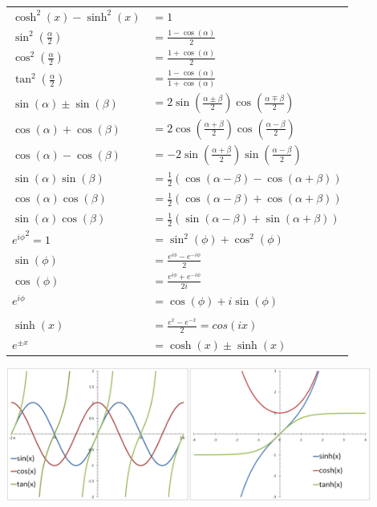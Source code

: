 \documentclass[6pt]{article}
\begin{document}
\begin{multicols*}{2}
\begin{multicols}{2}
	\columnbreak
	\hspace{-18pt}
	\begin{tabular}{l l}
		$ \cosh^2(x) - \sinh^2(x) $ & $= 1 $ \\
		$ \sin^2(\frac{\alpha}{2}) $  &  $ = \frac{1-\cos(\alpha)}{2} $ \\
		$ \cos^2(\frac{\alpha}{2}) $  &  $ = \frac{1+\cos(\alpha)}{2} $ \\
		$ \tan^2(\frac{\alpha}{2}) $  &  $ = \frac{1-\cos(\alpha)}{1+\cos(\alpha)} $ \\
		$ \sin(\alpha) \pm \sin(\beta) $  &  $ = 2 \sin(\frac{\alpha \pm \beta}{2}) \cos(\frac{\alpha \mp \beta}{2}) $ \\
		$ \cos(\alpha) + \cos(\beta) $  &  $ = 2 \cos(\frac{\alpha + \beta}{2}) \cos(\frac{\alpha - \beta}{2}) $ \\
		$ \cos(\alpha) - \cos(\beta) $  &  $ = - 2 \sin(\frac{\alpha + \beta}{2}) \sin(\frac{\alpha - \beta}{2}) $ \\
		$ \sin(\alpha)\sin(\beta) $  &  $ = \scriptstyle \frac{1}{2} \left( \cos(\alpha - \beta) - \cos(\alpha + \beta) \right) $ \\
		$ \cos(\alpha)\cos(\beta) $  &  $ = \scriptstyle \frac{1}{2} \left( \cos(\alpha - \beta) + \cos(\alpha + \beta) \right) $ \\
		$ \sin(\alpha)\cos(\beta) $  &  $ = \scriptstyle \frac{1}{2} \left( \sin(\alpha - \beta) + \sin(\alpha + \beta) \right) $ \\
		$ {e^{i\phi}}^2 = 1 $  & $ = \sin^2(\phi)+\cos^2(\phi) $ \\
		$ \sin(\phi) $  &  $ = \frac{e^{i \phi}-e^{-i\phi}}{2} $ \\
		$ \cos(\phi) $  &  $ = \frac{e^{i \phi}+e^{-i\phi}}{2i} $ \\
		$ e^{i\phi} $  &  $ = \cos(\phi)+i \sin(\phi) $ \\
		\\
		$ \sinh(x)$ & $= \frac{e^x-e^{-x}}{2} = cos(ix) $ \\
		$ e^{\pm x} $ & $= \cosh(x) \pm \sinh(x) $
	
	\end{tabular}
	\end{multicols}
	
	\begin{center}
	\includegraphics[width=120mm]{images/graphs.png}
	\end{center}



\end{multicols*}
\end{document}
